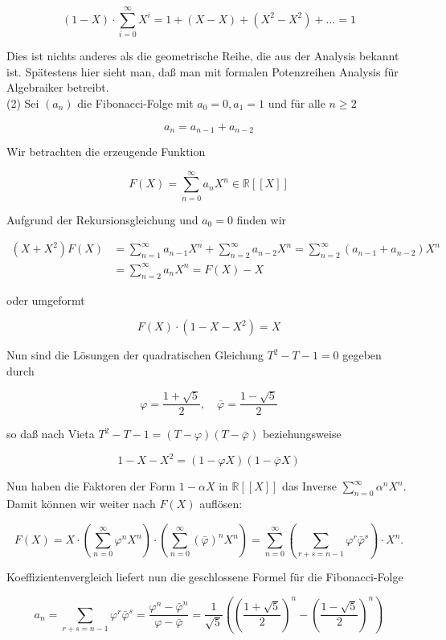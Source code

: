 \documentclass[10pt, letterpaper]{article}
\begin{document}
$$
(1-X) \cdot \sum_{i=0}^{\infty} X^{i}=1+(X-X)+\left(X^{2}-X^{2}\right)+\ldots=1
$$

Dies ist nichts anderes als die geometrische Reihe, die aus der Analysis bekannt ist. Spätestens hier sieht man, daß man mit formalen Potenzreihen Analysis für Algebraiker betreibt.\\
(2) Sei $\left(a_{n}\right)$ die Fibonacci-Folge mit $a_{0}=0, a_{1}=1$ und für alle $n \geq 2$

$$
a_{n}=a_{n-1}+a_{n-2}
$$

Wir betrachten die erzeugende Funktion

$$
F(X)=\sum_{n=0}^{\infty} a_{n} X^{n} \in \mathbb{R}[[X]]
$$

Aufgrund der Rekursionsgleichung und $a_{0}=0$ finden wir

$$
\begin{aligned}
\left(X+X^{2}\right) F(X) & =\sum_{n=1}^{\infty} a_{n-1} X^{n}+\sum_{n=2}^{\infty} a_{n-2} X^{n}=\sum_{n=2}^{\infty}\left(a_{n-1}+a_{n-2}\right) X^{n} \\
& =\sum_{n=2}^{\infty} a_{n} X^{n}=F(X)-X
\end{aligned}
$$

oder umgeformt

$$
F(X) \cdot\left(1-X-X^{2}\right)=X
$$

Nun sind die Lösungen der quadratischen Gleichung $T^{2}-T-1=0$ gegeben durch

$$
\varphi=\frac{1+\sqrt{5}}{2}, \quad \bar{\varphi}=\frac{1-\sqrt{5}}{2}
$$

so daß nach Vieta $T^{2}-T-1=(T-\varphi)(T-\bar{\varphi})$ beziehungsweise

$$
1-X-X^{2}=(1-\varphi X)(1-\bar{\varphi} X)
$$

Nun haben die Faktoren der Form $1-\alpha X$ in $\mathbb{R}[[X]]$ das Inverse $\sum_{n=0}^{\infty} \alpha^{n} X^{n}$. Damit können wir weiter nach $F(X)$ auflösen:

$$
F(X)=X \cdot\left(\sum_{n=0}^{\infty} \varphi^{n} X^{n}\right) \cdot\left(\sum_{n=0}^{\infty}(\bar{\varphi})^{n} X^{n}\right)=\sum_{n=0}^{\infty}\left(\sum_{r+s=n-1} \varphi^{r} \bar{\varphi}^{s}\right) \cdot X^{n} .
$$

Koeffizientenvergleich liefert nun die geschlossene Formel für die Fibonacci-Folge

$$
a_{n}=\sum_{r+s=n-1} \varphi^{r} \bar{\varphi}^{s}=\frac{\varphi^{n}-\bar{\varphi}^{n}}{\varphi-\bar{\varphi}}=\frac{1}{\sqrt{5}}\left(\left(\frac{1+\sqrt{5}}{2}\right)^{n}-\left(\frac{1-\sqrt{5}}{2}\right)^{n}\right)
$$
\end{document}
